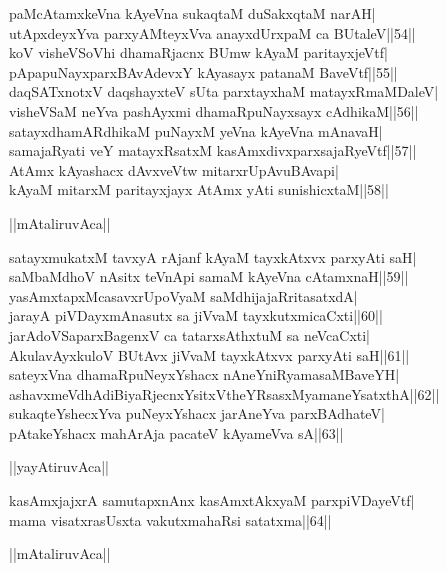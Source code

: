 \documentclass{article}
\begin{document}
paMcAtamxkeVna kAyeVna sukaqtaM duSakxqtaM narAH|\\
utApxdeyxYva parxyAMteyxVva anayxdUrxpaM ca BUtaleV||54||\\
koV visheVSoVhi dhamaRjacnx BUmw kAyaM paritayxjeVtf|\\
pApapuNayxparxBAvAdevxY kAyasayx patanaM BaveVtf||55||\\
daqSATxnotxV daqshayxteV sUta parxtayxhaM matayxRmaMDaleV|\\
visheVSaM neYva pashAyxmi dhamaRpuNayxsayx cAdhikaM||56||\\
satayxdhamARdhikaM puNayxM yeVna kAyeVna mAnavaH|\\
samajaRyati veY matayxRsatxM kasAmxdivxparxsajaRyeVtf||57||\\
AtAmx kAyashacx dAvxveVtw mitarxrUpAvuBAvapi|\\
kAyaM mitarxM paritayxjayx AtAmx yAti sunishicxtaM||58||\\

\begin{center}
||mAtaliruvAca||
\end{center}

satayxmukatxM tavxyA rAjanf kAyaM tayxkAtxvx parxyAti saH|\\
saMbaMdhoV nAsitx teVnApi samaM kAyeVna cAtamxnaH||59||\\
yasAmxtapxMcasavxrUpoVyaM saMdhijajaRritasatxdA|\\
jarayA piVDayxmAnasutx sa jiVvaM tayxkutxmicaCxti||60||\\
jarAdoVSaparxBagenxV ca tatarxsAthxtuM sa neVcaCxti|\\
AkulavAyxkuloV BUtAvx jiVvaM tayxkAtxvx parxyAti saH||61||\\
sateyxVna dhamaRpuNeyxYshacx nAneYniRyamasaMBaveYH|\\
ashavxmeVdhAdiBiyaRjecnxYsitxVtheYRsasxMyamaneYsatxthA||62||\\
sukaqteYshecxYva puNeyxYshacx jarAneYva parxBAdhateV|\\
pAtakeYshacx mahArAja pacateV kAyameVva sA||63||\\

\begin{center}
||yayAtiruvAca||
\end{center}

kasAmxjajxrA samutapxnAnx kasAmxtAkxyaM parxpiVDayeVtf|\\
mama visatxrasUsxta vakutxmahaRsi satatxma||64||\\

\begin{center}
||mAtaliruvAca||
\end{center}
\end{document}
